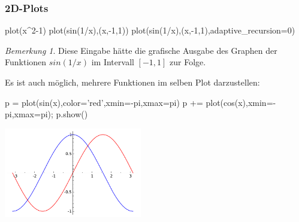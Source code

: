 \documentclass[fontsize=12pt,paper=a4,twoside,bibtotoc,idxtotoc,
liststotoc,pagesize,BCOR1.2cm,DIV15,chapterprefix,pagesize=pdftex]{scrbook}
\theoremstyle{plain}
\theoremstyle{definition}
\theoremstyle{remark}
\newtheorem{bem}[equation]{Bemerkung}
\begin{document}
\subsubsection{2D-Plots}
\begin{sagein}
plot(x^2-1)
plot(sin(1/x),(x,-1,1))
plot(sin(1/x),(x,-1,1),adaptive_recursion=0)
\end{sagein}
\begin{bem}
 Diese Eingabe hätte die grafische Ausgabe des Graphen der Funktionen $sin(1/x)$ im Intervall $[-1,1]$ zur Folge.
\end{bem}
Es ist auch möglich, mehrere Funktionen im selben Plot darzustellen:
\begin{sagein}
p = plot(sin(x),color='red',xmin=-pi,xmax=pi)
p += plot(cos(x),xmin=-pi,xmax=pi); p.show()
\end{sagein}
\begin{center}
\includegraphics[width=6cm]{sincos2.pdf} 
\end{center}
\end{document}

